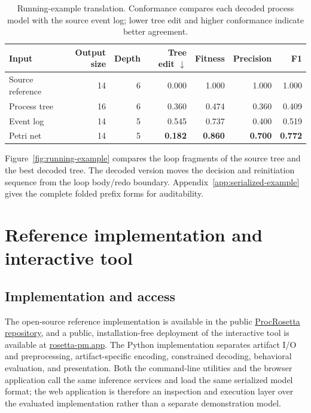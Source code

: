 \documentclass[pdflatex,sn-basic]{sn-jnl}
\newcommand{\best}[1]{\textbf{#1}}
\begin{document}
\begin{table}[!t]
\centering
\caption{Running-example translation. Conformance compares each decoded process model with the source event log; lower tree edit and higher conformance indicate better agreement.}
\label{tab:running}
\begin{tabular}{@{}lrrrrrr@{}}
\toprule
Input & Output size & Depth & Tree edit $\downarrow$ & Fitness & Precision & F1 \\
\midrule
Source reference & 14 & 6 & 0.000 & 1.000 & 1.000 & 1.000 \\
Process tree & 16 & 6 & 0.360 & 0.474 & 0.360 & 0.409 \\
Event log & 14 & 5 & 0.545 & 0.737 & 0.400 & 0.519 \\
Petri net & 14 & 5 & \best{0.182} & \best{0.860} & \best{0.700} & \best{0.772} \\
\bottomrule
\end{tabular}
\end{table}

Figure~\ref{fig:running-example} compares the loop fragments of the source tree and the best decoded tree. The decoded version moves the decision and reinitiation sequence from the loop body/redo boundary. Appendix~\ref{app:serialized-example} gives the complete folded prefix forms for auditability.



\section{Reference implementation and interactive tool}\label{sec:reproduction}

\subsection{Implementation and access}

The open-source reference implementation is available in the public \href{https://github.com/fit-alessandro-berti/proc-rosetta}{ProcRosetta repository}, and a public, installation-free deployment of the interactive tool is available at \href{https://rosetta-pm.app}{rosetta-pm.app}. The Python implementation separates artifact I/O and preprocessing, artifact-specific encoding, constrained decoding, behavioral evaluation, and presentation. Both the command-line utilities and the browser application call the same inference services and load the same serialized model format; the web application is therefore an inspection and execution layer over the evaluated implementation rather than a separate demonstration model.
\end{document}
